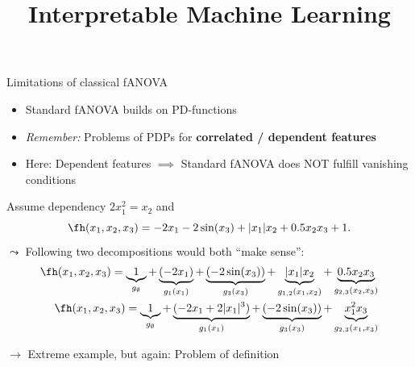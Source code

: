 \documentclass[11pt,compress,t,notes=noshow, aspectratio=169, xcolor=table]{beamer}
\title{Interpretable Machine Learning}
\date{}
\begin{document}
\newcommand{\titlefigure}{figure/25-05-31_Hooker_2004_graph_fANOVA}
\newcommand{\learninggoals}{
\item Limitations of classical fANOVA
\item Alternatives: Generalized fANOVA and ALE
\item Advantages and relevance of functional decompositions
}


\begin{frame}{Limitations of classical fANOVA}

    \begin{itemize}
    
        \item Standard fANOVA builds on PD-functions
        
        \item \textit{Remember:} Problems of PDPs for \textbf{correlated / dependent features}
        \item Here: Dependent features $\implies$ Standard fANOVA does NOT fulfill vanishing conditions %
    \end{itemize}
    \pause
    \begin{example}
        Assume dependency \(2x_1^2 = x_2\) and
        \begin{equation*}
            \fh(x_1, x_2, x_3) = - 2x_1 - 2\sin(x_3) + |x_1|x_2 + 0.5 x_2 x_3 + 1.
        \end{equation*}
        $\leadsto$ Following two decompositions would both ``make sense'':
        \begin{align*}
            \fh(x_1, x_2, x_3)
            = \underbrace{1}_{g_\emptyset}
                + \underbrace{(- 2x_1)}_{g_1(x_1)} 
                + \underbrace{(- 2\sin(x_3))}_{g_3(x_3)}
                + \underbrace{|x_1|x_2}_{g_{1,2}(x_1, x_2)} 
                + \underbrace{0.5 x_2 x_3}_{g_{2,3}(x_2, x_3)} \\
            \fh(x_1, x_2, x_3)
            = \underbrace{1}_{g_\emptyset}
                + \underbrace{(- 2x_1 + 2 |x_1|^3)}_{g_1(x_1)} 
                + \underbrace{(- 2\sin(x_3))}_{g_3(x_3)}
                + \underbrace{x_1^2 x_3}_{g_{2,3}(x_1, x_3)}
        \end{align*}
    \end{example}
    \pause
    $\rightarrow$ Extreme example, but again: Problem of definition


    
    
\end{frame}
\end{document}

